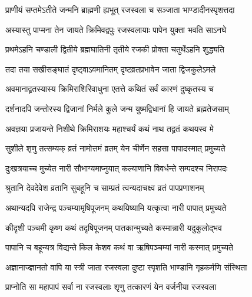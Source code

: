
\twolineshloka
{प्राणीयं सप्तमेऽतीते जन्मनि ब्राह्मणी ह्यभूत्}
{रजस्वला च सञ्जाता भाण्डादीनस्पृशत्तदा} %

\twolineshloka
{अस्यास्तु पाप्मना तेन जायते क्रिमिवद्वपुः}
{रजस्वलायाः पापेन युक्ता भवति साऽनघे} %

\twolineshloka
{प्रथमेऽहनि चण्डाली द्वितीये ब्रह्मघातिनी}
{तृतीये रजकी प्रोक्ता चतुर्थेऽहनि शुद्ध्यति} %

\twolineshloka
{तदा तया सखीसङ्घातं दृष्ट्वाऽवमानितम्}
{दृष्टव्रतप्रभावेन जाता द्विजकुलेऽमले} %

\twolineshloka
{अवमानाद्व्रतस्यास्य क्रिमिराशिरिवाधुना}
{एतत्ते कथितं सर्वं कारणं दुष्कृतस्य च} %


\twolineshloka
{दर्शनादपि जन्तोरस्य द्विजानां निर्मले कुले}
{जन्म युष्मद्विधानां हि जायते ब्रह्मतेजसाम्} %

\twolineshloka
{अवज्ञया प्रजायन्ते निशीथे क्रिमिराशयः}
{महाश्चर्यं कथं नाथ तद्व्रतं कथयस्व मे} %


\twolineshloka
{सुशीले शृणु तत्सम्यक् व्रतं नामोत्तमं व्रतम्}
{येन चीर्णेन सहसा पापादस्मात् प्रमुच्यते} %

\twolineshloka
{दुःखत्रयाच्च मुच्येत नारी सौभाग्यमाप्नुयात्}
{कल्याणानि विवर्धन्ते सम्पदश्च निरापदः} %


\twolineshloka
{श्रुतानि देवदेवेश व्रतानि सुबहूनि च}
{साम्प्रतं त्वन्यदाचक्ष्व व्रतं पापप्रणाशनम्} %


\twolineshloka
{अथान्यदपि राजेन्द्र पञ्चम्यामृषिपूजनम्}
{कथयिष्यामि यत्कृत्वा नारी पापात् प्रमुच्यते} %


\twolineshloka
{कीदृशी पञ्चमी कृष्ण कथं तदृषिपूजनम्}
{पातकान्मुच्यते कस्मान्नारी यदुकुलोद्भव} %

\twolineshloka
{पापानि च बहून्यत्र विद्यन्ते किल केशव}
{कथं वा ऋषिपञ्चम्यां नारी कस्मात् प्रमुच्यते} %


\twolineshloka
{अज्ञानाज्ज्ञानतो वापि या स्त्री जाता रजस्वला}
{दुष्टा स्पृशति भाण्डानि गृहकर्मणि संस्थिता} %

\twolineshloka
{प्राप्नोति सा महापापं सर्वा ना रजस्वलाः}
{शृणु तत्कारणं येन वर्जनीया रजस्वला} %

